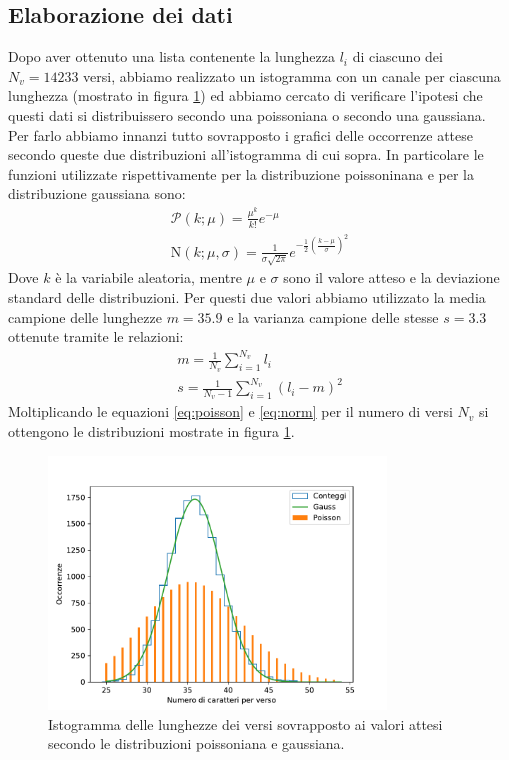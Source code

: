 \documentclass[a4paper]{article}
\begin{document}
    \subsection{Elaborazione dei dati}
        Dopo aver ottenuto una lista contenente la lunghezza $l_i$ di ciascuno dei
        $N_v=14233$ versi, abbiamo realizzato un istogramma con un canale per ciascuna
        lunghezza (mostrato in figura \ref{fig:lunghezze_versi}) ed abbiamo cercato di
        verificare l'ipotesi che questi dati si distribuissero secondo una poissoniana
        o secondo una gaussiana.\\
        Per farlo abbiamo innanzi tutto sovrapposto i grafici delle occorrenze attese
        secondo queste due distribuzioni all'istogramma di cui sopra. In particolare le funzioni
        utilizzate rispettivamente per la distribuzione poissoninana e per la distribuzione
        gaussiana sono:
        \begin{gather}
            \mathcal{P}\left( k;\mu \right) = \frac{\mu^{k}}{k!}e^{-\mu} \label{eq:poisson}\\
            \mathrm{N}(k; \mu, \sigma) = \frac{1}{\sigma \sqrt{2 \pi} } e^{-\frac{1}{2}\left( \frac{k-\mu}{\sigma} \right)^2 } \label{eq:norm}
        \end{gather}
        Dove $k$ è la variabile aleatoria, mentre $\mu$ e $\sigma$ sono il valore atteso
        e la deviazione standard delle distribuzioni. Per questi due valori abbiamo
        utilizzato la media campione delle lunghezze $m = 35.9$ e la varianza campione
        delle stesse $s = 3.3$ ottenute tramite le relazioni:
        \begin{gather}
            m = \frac{1}{N_v}\sum_{i=1}^{N_v} l_i\label{eq:media}\\
            s = \frac{1}{N_v-1}\sum_{i=1}^{N_v} \left( l_i-m \right) ^2\label{eq:deviazione_standard}
        \end{gather}
        Moltiplicando le equazioni \ref{eq:poisson} e \ref{eq:norm} per il numero di versi
        $N_v$ si ottengono le distribuzioni mostrate in figura \ref{fig:lunghezze_versi}.\\
    \begin{figure}[ht!]
        \centering
        \includegraphics[width=0.8\textwidth]{extra/lunghezze_versi.pdf}
        \caption{Istogramma delle lunghezze dei versi sovrapposto ai valori attesi secondo
        le distribuzioni poissoniana e gaussiana.}
        \label{fig:lunghezze_versi}
    \end{figure}
\end{document}

